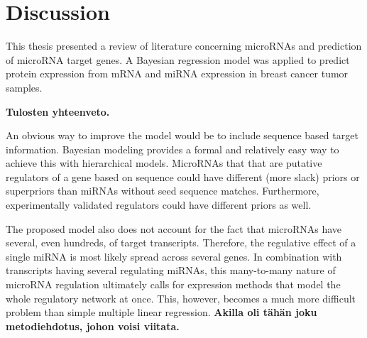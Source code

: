 

\section{Discussion}

This thesis presented a review of literature concerning microRNAs and
prediction of microRNA target genes. A Bayesian regression model was applied
to predict protein expression from mRNA and miRNA expression in breast
cancer tumor samples.

\textbf{Tulosten yhteenveto.}

An obvious way to improve the model would be to include sequence based target
information. Bayesian modeling provides a formal and relatively easy
way to achieve this with hierarchical models. MicroRNAs that
that are putative regulators of a gene based on sequence could have
different (more slack) priors or superpriors than miRNAs without
seed sequence matches. Furthermore, experimentally validated regulators
could have different priors as well.

The proposed model also does not account for the fact that microRNAs have
several, even hundreds, of target transcripts. Therefore, the regulative
effect of a single miRNA is most likely spread across several genes. In combination
with transcripts having several regulating miRNAs, this many-to-many nature of
microRNA regulation ultimately calls for expression methods that model the
whole regulatory network at once. This, however, becomes a much more difficult
problem than simple multiple linear regression. \textbf{Akilla oli tähän joku
metodiehdotus, johon voisi viitata.}
